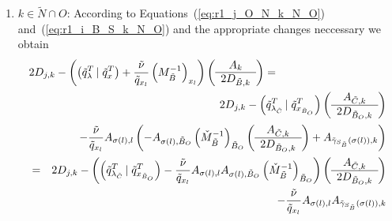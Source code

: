 \documentclass[a4paper]{article}
\begin{document}
\begin{enumerate}
\item $k \in \tilde{N} \cap O$:
According to Equations~(\ref{eq:r1_j_O_N_k_N_O})
and~(\ref{eq:r1_i_B_S_k_N_O}) and the appropriate changes neccessary we obtain
\begin{eqnarray}
\lefteqn{
2D_{j,k}-\left(
          \left(\tilde{q}_{\lambda}^{T}\left|\right. \tilde{q}_{x}^{T}\right)
	  +\frac{\tilde{\nu}}{\tilde{q}_{x_{l}}}
	  \left(M_{\tilde{B}}^{-1}\right)_{x_{l}}
	\right)
\left(\begin{array}{c}
        A_{k} \\
	\hline
	2D_{\tilde{B},k}
      \end{array}
\right)
=}
\nonumber \\
&&
2D_{j, k}
-\left(\tilde{q}_{\lambda_{\tilde{C}}}^{T}\left|\right.
  \tilde{q}_{x_{\tilde{B}_{O}}}^{T}\right)
\left(\begin{array}{c}
        A_{\tilde{C}, k} \\
	\hline
	2D_{\tilde{B}_{O}, k}
      \end{array}
\right)
\nonumber \\
&&
-\frac{\tilde{\nu}}{\tilde{q}_{x_{l}}}A_{\sigma(l),l}
\left(
  -A_{\sigma(l), \tilde{B}_{O}}
    \left(\check{M}_{\tilde{B}}^{-1}\right)_{\tilde{B}_{O}}
  \left(\begin{array}{c}
          A_{\tilde{C},k} \\
	  \hline
	  2D_{\tilde{B}_{O},k}
         \end{array}
  \right)
  +A_{\tilde{\gamma}_{S_{\tilde{B}}}(\sigma(l)), k}
\right)
\nonumber \\
&=&
2D_{j, k}
-\left(
  \left(\tilde{q}_{\lambda_{\tilde{C}}}^{T}\left|\right.
  \tilde{q}_{x_{\tilde{B}_{O}}}^{T}\right)
 -\frac{\tilde{\nu}}{\tilde{q}_{x_{l}}}
   A_{\sigma(l),l}A_{\sigma(l), \tilde{B}_{O}}
  \left(\check{M}_{\tilde{B}}^{-1}\right)_{\tilde{B}_{O}}
\right)
\left(\begin{array}{c}
        A_{\tilde{C},k} \\
	\hline
	2D_{\tilde{B}_{O},k}
       \end{array}
\right)
\nonumber \\
&&
-\frac{\tilde{\nu}}{\tilde{q}_{x_{l}}}A_{\sigma(l),l}
  A_{\tilde{\gamma}_{S_{\tilde{B}}}(\sigma(l)), k}
\end{eqnarray}
\end{enumerate}
\end{document}
